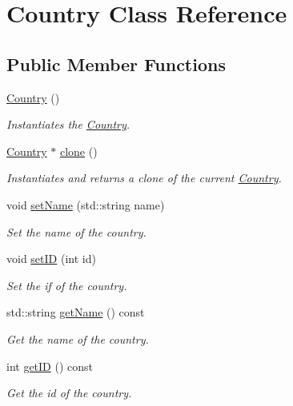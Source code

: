 \hypertarget{classCountry}{}\section{Country Class Reference}
\label{classCountry}
\subsection*{Public Member Functions}
\begin{DoxyCompactItemize}
\item 
\mbox{\label{classCountry_a4cba457856775a13a17dfcb11a77e224}} 
\hyperlink{classCountry_a4cba457856775a13a17dfcb11a77e224}{Country} ()
\begin{DoxyCompactList}\small\item\em Instantiates the \hyperlink{classCountry}{Country}. \end{DoxyCompactList}\item 
\hyperlink{classCountry}{Country} $\ast$ \hyperlink{classCountry_a82562b18230bbeceb22b13c0ab046a1c}{clone} ()
\begin{DoxyCompactList}\small\item\em Instantiates and returns a clone of the current \hyperlink{classCountry}{Country}. \end{DoxyCompactList}\item 
void \hyperlink{classCountry_ae4773ebfffe4f9d2d2db1b54181b67ab}{set\+Name} (std\+::string name)
\begin{DoxyCompactList}\small\item\em Set the name of the country. \end{DoxyCompactList}\item 
void \hyperlink{classCountry_a35ecd0419e6a6eaf358889527c280d82}{set\+ID} (int id)
\begin{DoxyCompactList}\small\item\em Set the if of the country. \end{DoxyCompactList}\item 
std\+::string \hyperlink{classCountry_af86e64cecec9c266dbf284329ab072f3}{get\+Name} () const
\begin{DoxyCompactList}\small\item\em Get the name of the country. \end{DoxyCompactList}\item 
int \hyperlink{classCountry_abb770576662c91a71c01cf078b98c0af}{get\+ID} () const
\begin{DoxyCompactList}\small\item\em Get the id of the country. \end{DoxyCompactList}\end{DoxyCompactItemize}


